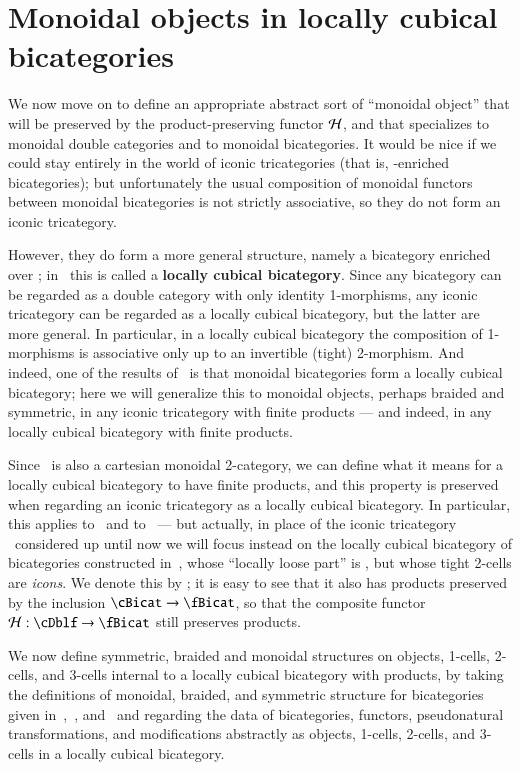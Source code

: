 \section{Monoidal objects in locally cubical bicategories}
\label{sec:mono-objects}

We now move on to define an appropriate abstract sort of ``monoidal object'' that will be preserved by the product-preserving functor $\mathcal{H}$, and that specializes to monoidal double categories and to monoidal bicategories.
It would be nice if we could stay entirely in the world of iconic tricategories (that is, \Icon-enriched bicategories); but unfortunately the usual composition of monoidal functors between monoidal bicategories is not strictly associative, so they do not form an iconic tricategory.

However, they do form a more general structure, namely a bicategory enriched over \cDbl; in~\cite{gg:ldstr-tricat} this is called a \textbf{locally cubical bicategory}.
Since any bicategory can be regarded as a double category with only identity 1-morphisms, any iconic tricategory can be regarded as a locally cubical bicategory, but the latter are more general.
In particular, in a locally cubical bicategory the composition of 1-morphisms is associative only up to an invertible (tight) 2-morphism.
And indeed, one of the results of~\cite{gg:ldstr-tricat} is that monoidal bicategories form a locally cubical bicategory; here we will generalize this to monoidal objects, perhaps braided and symmetric, in any iconic tricategory with finite products --- and indeed, in any locally cubical bicategory with finite products.

Since \cDbl\ is also a cartesian monoidal 2-category, we can define what it means for a locally cubical bicategory to have finite products, and this property is preserved when regarding an iconic tricategory as a locally cubical bicategory.
In particular, this applies to \cDblf\ and to \cBicat\ --- but actually, in place of the iconic tricategory \cBicat\ considered up until now we will focus instead on the locally cubical bicategory of bicategories constructed in~\cite{gg:ldstr-tricat}, whose ``locally loose part'' is \cBicat, but whose tight 2-cells are \emph{icons}.
We denote this by \fBicat; it is easy to see that it also has products preserved by the inclusion $\cBicat\to \fBicat$, so that the composite functor $\cH : \cDblf \to\fBicat$ still preserves products.

We now define symmetric, braided and monoidal structures on objects, 1-cells, 2-cells, and 3-cells internal to a locally cubical bicategory with products, by taking the definitions of monoidal, braided, and symmetric structure for bicategories given in~\cite{nick:tricatsbook},~\cite{mccrudden:bal-coalgb}, and~\cite{gg:ldstr-tricat} and regarding the data of bicategories, functors, pseudonatural transformations, and modifications abstractly as objects, 1-cells, 2-cells, and 3-cells in a locally cubical bicategory.

